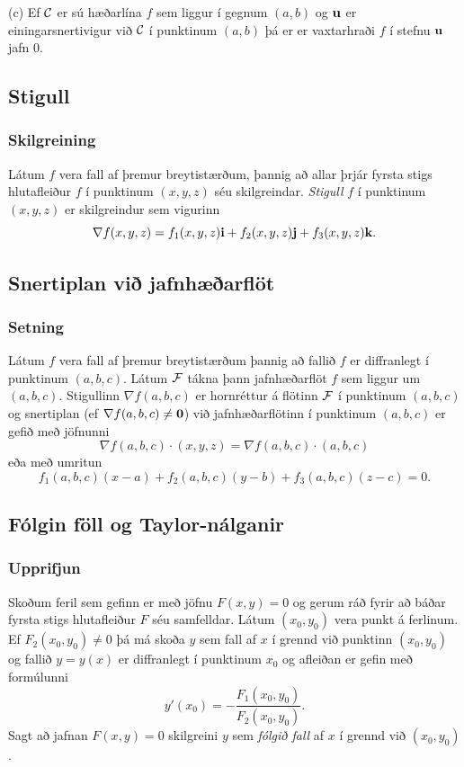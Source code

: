 \medskip
(c)  Ef $\cal C$ er sú hæðarlína $f$ sem liggur í gegnum $(a,b)$ og
$\mbox{${\bf u}$}$ er einingarsnertivigur við $\cal C$ í punktinum $(a,b)$ þá er
er vaxtarhraði $f$ í stefnu $\mbox{${\bf u}$}$ jafn 0. 




\subsection{Stigull} 

\subsubsection{Skilgreining }
 Látum $f$ vera fall af þremur
breytistærðum, þannig að allar þrjár fyrsta stigs hlutafleiður $f$ í
punktinum $(x,y,z)$ séu skilgreindar.  {\em Stigull} $f$ í punktinum
$(x,y,z)$ er skilgreindur sem vigurinn
$$\nabla f(x,y,z)=f_1(x,y,z)\mbox{${\bf i}$}+f_2(x,y,z)\mbox{${\bf j}$}+f_3(x,y,z)\mbox{${\bf k}$}.$$





\subsection{Snertiplan við jafnhæðarflöt} 

\subsubsection{Setning }
 Látum $f$ vera fall af þremur
breytistærðum þannig að fallið $f$ er diffranlegt í punktinum $(a,b,c)$.  Látum $\cal F$ tákna þann jafnhæðarflöt $f$ sem liggur um $(a,b,c)$.  Stigullinn $\nabla f(a,b,c)$ er hornréttur á flötinn $\cal F$ í punktinum $(a,b,c)$ og snertiplan (ef $\nabla f(a,b,c)\neq\mbox{${\bf 0}$}$) 
við jafnhæðarflötinn í punktinum $(a,b,c)$ er gefið með jöfnunni 
$$\nabla f(a,b,c)\cdot(x,y,z)=\nabla f(a,b,c)\cdot(a,b,c)$$
eða með umritun
$$f_1(a,b,c)(x-a)+f_2(a,b,c)(y-b)+f_3(a,b,c)(z-c)=0.$$





\subsection{Fólgin föll og Taylor-nálganir} 

\subsubsection{Upprifjun }
 Skoðum feril sem gefinn er með jöfnu $F(x,y)=0$
og gerum ráð fyrir að báðar fyrsta stigs
hlutafleiður $F$ séu samfelldar.  Látum $(x_0,y_0)$
vera punkt á ferlinum.  Ef $F_2(x_0,y_0)\neq 0$ þá má skoða $y$ sem
fall af $x$ í grennd við punktinn $(x_0,y_0)$ og fallið $y=y(x)$ er
diffranlegt í punktinum $x_0$ og afleiðan er gefin með formúlunni
$$y'(x_0)=-\frac{F_1(x_0,y_0)}{F_2(x_0,y_0)}.$$
Sagt að jafnan $F(x,y)=0$ skilgreini $y$ sem {\em fólgið fall} af $x$
  í grennd við $(x_0,y_0)$.  




